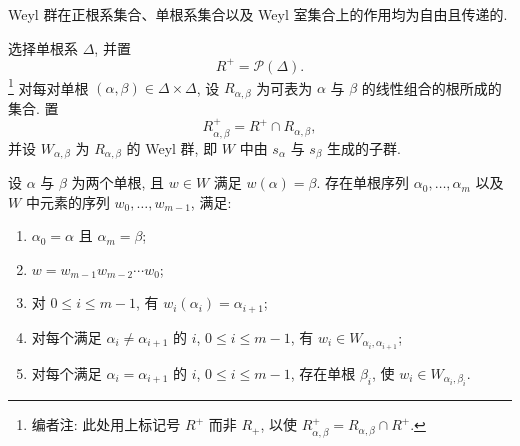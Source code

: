 \begin{corollary}\label{sga3:XXI:5.5}
Weyl 群在正根系集合、单根系集合以及 Weyl 室集合上的作用均为自由且传递的.
\end{corollary}

选择单根系 \(\Delta\), 并置
\[
 R^+=\mathscr{P}(\Delta).
\]
\footnote{编者注: 此处用上标记号 \(R^+\) 而非 \(R_+\), 以使 \(R^+_{\alpha,\beta}=R_{\alpha,\beta}\cap R^+\).}
对每对单根 \((\alpha,\beta)\in\Delta\times\Delta\), 设 \(R_{\alpha,\beta}\) 为可表为 \(\alpha\) 与 \(\beta\) 的线性组合的根所成的集合. 置
\[
 R^+_{\alpha,\beta}=R^+\cap R_{\alpha,\beta},
\]
并设 \(W_{\alpha,\beta}\) 为 \(R_{\alpha,\beta}\) 的 Weyl 群, 即 \(W\) 中由 \(s_\alpha\) 与 \(s_\beta\) 生成的子群.

\begin{theorem}[Tits]\label{sga3:XXI:5.6}
设 \(\alpha\) 与 \(\beta\) 为两个单根, 且 \(w\in W\) 满足 \(w(\alpha)=\beta\). 存在单根序列 \(\alpha_0,\ldots,\alpha_m\) 以及 \(W\) 中元素的序列 \(w_0,\ldots,w_{m-1}\), 满足:
\begin{enumerate}
\item[(i)] \(\alpha_0=\alpha\) 且 \(\alpha_m=\beta\);
\item[(ii)] \(w=w_{m-1}w_{m-2}\cdots w_0\);
\item[(iii)] 对 \(0\le i\le m-1\), 有 \(w_i(\alpha_i)=\alpha_{i+1}\);
\item[(iv)] 对每个满足 \(\alpha_i\ne\alpha_{i+1}\) 的 \(i\), \(0\le i\le m-1\), 有 \(w_i\in W_{\alpha_i,\alpha_{i+1}}\);
\item[(v)] 对每个满足 \(\alpha_i=\alpha_{i+1}\) 的 \(i\), \(0\le i\le m-1\), 存在单根 \(\beta_i\), 使 \(w_i\in W_{\alpha_i,\beta_i}\).
\end{enumerate}
\end{theorem}


